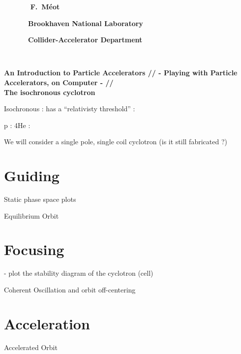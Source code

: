 \documentclass[12pt]{article}
\begin{document}
{
 ~~~~~~~ \hfill \large   \bf F.~M\'eot 

  ~~~~~~~\hfill \large   \bf Brookhaven National Laboratory

  ~~~~~~~\hfill \large   \bf Collider-Accelerator Department
}

~~~~~~~~~~~~~~~~~~~~~~~~~

\vspace{-10mm}

\begin{center} 
{\Huge  
\bf  An Introduction to Particle Accelerators //
- Playing with Particle Accelerators, on Computer -  //
~ \\
The isochronous cyclotron

}
\end{center} 

\tableofcontents





\clearpage


Isochronous : has a ``relativisty threshold'' :

p :
4He : 

We will consider a single pole, single coil cyclotron (is it still fabricated ?)



\section{Guiding}

Static phase space plots

Equilibrium Orbit



\section{Focusing}

- plot the stability diagram of the cyclotron (cell)

Coherent Oscillation and orbit off-centering


\section{Acceleration}

Accelerated Orbit
\end{document}
